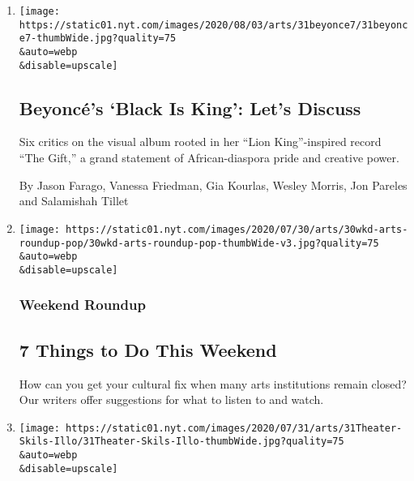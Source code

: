 \begin{enumerate}
\def\labelenumi{\arabic{enumi}.}
\item
  \href{/2020/07/31/arts/music/beyonce-black-is-king.html}{}

  \texttt{[image: https://static01.nyt.com/images/2020/08/03/arts/31beyonce7/31beyonce7-thumbWide.jpg?quality=75\\\&auto=webp\\\&disable=upscale]}

  \hypertarget{beyoncuxe9s-black-is-king-lets-discuss}{%
  \subsection{Beyoncé's `Black Is King': Let's
  Discuss}\label{beyoncuxe9s-black-is-king-lets-discuss}}

  Six critics on the visual album rooted in her ``Lion King''-inspired
  record ``The Gift,'' a grand statement of African-diaspora pride and
  creative power.

  By Jason Farago, Vanessa Friedman, Gia Kourlas, Wesley Morris, Jon
  Pareles and Salamishah Tillet
\item
  \href{/2020/07/30/arts/things-to-do-weekend-coronavirus.html}{}

  \texttt{[image: https://static01.nyt.com/images/2020/07/30/arts/30wkd-arts-roundup-pop/30wkd-arts-roundup-pop-thumbWide-v3.jpg?quality=75\\\&auto=webp\\\&disable=upscale]}

  \hypertarget{weekend-roundup}{%
  \subsubsection{Weekend Roundup}\label{weekend-roundup}}

  \hypertarget{7-things-to-do-this-weekend}{%
  \subsection{7 Things to Do This
  Weekend}\label{7-things-to-do-this-weekend}}

  How can you get your cultural fix when many arts institutions remain
  closed? Our writers offer suggestions for what to listen to and watch.
\item
  \href{/2020/07/30/theater/theater-classes-at-home.html}{}

  \texttt{[image: https://static01.nyt.com/images/2020/07/31/arts/31Theater-Skils-Illo/31Theater-Skils-Illo-thumbWide.jpg?quality=75\\\&auto=webp\\\&disable=upscale]}

  \hypertarget{how-i-spent-my-summer-vacation-singing-dancing-knife-fighting}{%
}
\end{enumerate}
